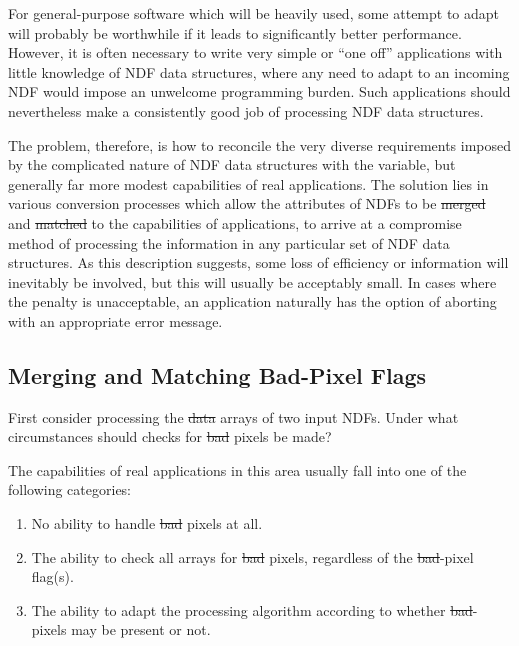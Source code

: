 For general-purpose software which will be heavily used, some attempt to 
adapt will probably be worthwhile if it leads to significantly better
performance. 
However, it is often necessary to write very simple or ``one off''
applications with little knowledge of NDF data structures, where any need to
adapt to an incoming NDF would impose an unwelcome programming burden. 
Such applications should nevertheless make a consistently good job of
processing NDF data structures. 

The problem, therefore, is how to reconcile the very diverse requirements
imposed by the complicated nature of NDF data structures with the variable,
but generally far more modest capabilities of real applications. 
The solution lies in various conversion processes which allow the attributes
of NDFs to be \st{merged\/} and \st{matched\/} to the capabilities of
applications, to arrive at a compromise method of processing the information
in any particular set of NDF data structures. 
As this description suggests, some loss of efficiency or information will
inevitably be involved, but this will usually be acceptably small.
In cases where the penalty is unacceptable, an application naturally has the
option of aborting with an appropriate error message. 

\subsection{\label{ss:mbad}Merging and Matching Bad-Pixel Flags}

First consider processing the \st{data\/} arrays of two input NDFs.
Under what circumstances should checks for \st{bad\/} pixels be made? 

The capabilities of real applications in this area usually fall into one of
the following categories: 

\begin{enumerate}

\item No ability to handle \st{bad\/} pixels at all.

\item The ability to check all arrays for \st{bad\/} pixels, regardless of
the \st{bad\/}-pixel flag(s). 

\item The ability to adapt the processing algorithm according to whether
\st{bad\/}-pixels may be present or not. 

\end{enumerate}

